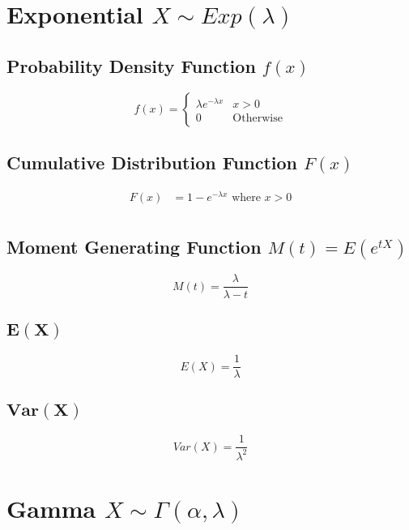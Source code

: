 \documentclass[12pt]{article}
\begin{document}
\newpage
\section{Exponential $X \sim Exp(\lambda)$}
\subsection{Probability Density Function $f(x)$}

\begin{equation*}
  f(x) =
  \begin{cases}
     \lambda e^{-\lambda x} & x>0 \\
     0 & \text{Otherwise}
  \end{cases}
\end{equation*}

\subsection{Cumulative Distribution Function $F(x)$}
\begin{align*}
  F(x) &= 1-e^{-\lambda x} \text{ where $x>0$}\\
\end{align*}

\subsection{Moment Generating Function $M(t)=E(e^{tX})$}

\begin{equation*}
    M(t)=\frac{\lambda}{\lambda -t}
\end{equation*}

\subsection{$\bm{E(X)}$}

\begin{equation*}
  E(X) = \frac{1}{\lambda}
\end{equation*}

\subsection{$\bm{Var(X)}$}

\begin{equation*}
  Var(X)= \frac{1}{\lambda^{2}}
\end{equation*}

\newpage
\section{Gamma $X \sim \Gamma(\alpha,\lambda)$}
\end{document}
